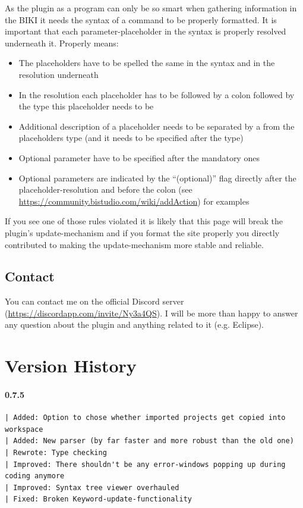 \documentclass[twoside=false]{scrbook}
\newcommand{\eclipse}{Eclipse\xspace}
\begin{document}
	As the plugin as a program can only be so smart when gathering information in the BIKI it needs the syntax of a command to be properly formatted. It is important that each parameter-placeholder in the syntax is properly resolved underneath it. Properly means:
	\begin{itemize}
		\item The placeholders have to be spelled the same in the syntax and in the resolution underneath
		\item In the resolution each placeholder has to be followed by a colon followed by the type this placeholder needs to be
		\item Additional description of a placeholder needs to be separated by a \keys{-} from the placeholders type (and it needs to be specified after the type)
		\item Optional parameter have to be specified after the mandatory ones
		\item Optional parameters are indicated by the “(optional)” flag directly after the placeholder-resolution and before the colon (see \url{https://community.bistudio.com/wiki/addAction}) for examples
	\end{itemize}
	
	If you see one of those rules violated it is likely that this page will break the plugin's update-mechanism and if you format the site properly you directly contributed to making the update-mechanism more stable and reliable.

	
	\section{Contact}
	\label{sec:Contact}
	You can contact me on the official Discord server (\url{https://discordapp.com/invite/Ny3a4QS}). I will be more than happy to answer any question about the plugin and anything related to it (e.g. \eclipse).
	
	
	
	\chapter{Version History}
	\label{ch:VersionHistory}
	
	\subsubsection*{0.7.5}
	\begin{lstlisting}[breaklines=true]
| Added: Option to chose whether imported projects get copied into workspace
| Added: New parser (by far faster and more robust than the old one)
| Rewrote: Type checking
| Improved: There shouldn't be any error-windows popping up during coding anymore
| Improved: Syntax tree viewer overhauled
| Fixed: Broken Keyword-update-functionality
	\end{lstlisting}
	
\end{document}
